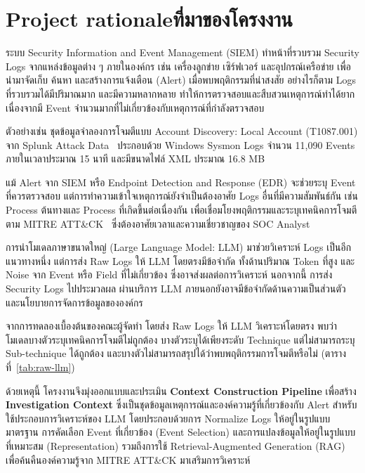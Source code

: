 \section{\ifenglish Project rationale\else ที่มาของโครงงาน\fi}
ระบบ Security Information and Event Management (SIEM) ทำหน้าที่รวบรวม
Security Logs จากแหล่งข้อมูลต่าง ๆ ภายในองค์กร เช่น เครื่องลูกข่าย
เซิร์ฟเวอร์ และอุปกรณ์เครือข่าย เพื่อนำมาจัดเก็บ ค้นหา และสร้างการแจ้งเตือน
(Alert) เมื่อพบพฤติกรรมที่น่าสงสัย อย่างไรก็ตาม Logs ที่รวบรวมได้มีปริมาณมาก
และมีความหลากหลาย ทำให้การตรวจสอบและสืบสวนเหตุการณ์ทำได้ยาก
เนื่องจากมี Event จำนวนมากที่ไม่เกี่ยวข้องกับเหตุการณ์ที่กำลังตรวจสอบ

ตัวอย่างเช่น ชุดข้อมูลจำลองการโจมตีแบบ Account Discovery: Local Account
(T1087.001) จาก Splunk Attack Data~\cite{splunk-attack-data}
ประกอบด้วย Windows Sysmon Logs จำนวน 11,090 Events ภายในเวลาประมาณ
15 นาที และมีขนาดไฟล์ XML ประมาณ 16.8 MB

แม้ Alert จาก SIEM หรือ Endpoint Detection and Response (EDR) 
จะช่วยระบุ Event ที่ควรตรวจสอบ แต่การทำความเข้าใจเหตุการณ์ยังจำเป็นต้องอาศัย
Logs อื่นที่มีความสัมพันธ์กัน เช่น Process ต้นทางและ Process ที่เกิดขึ้นต่อเนื่องกัน
เพื่อเชื่อมโยงพฤติกรรมและระบุเทคนิคการโจมตีตาม MITRE
ATT\&CK~\cite{mitre-attack} ซึ่งต้องอาศัยเวลาและความเชี่ยวชาญของ
SOC Analyst

การนำโมเดลภาษาขนาดใหญ่ (Large Language Model: LLM) มาช่วยวิเคราะห์
Logs เป็นอีกแนวทางหนึ่ง แต่การส่ง Raw Logs ให้ LLM โดยตรงมีข้อจำกัด
ทั้งด้านปริมาณ Token ที่สูง และ Noise จาก Event หรือ Field ที่ไม่เกี่ยวข้อง
ซึ่งอาจส่งผลต่อการวิเคราะห์ นอกจากนี้ การส่ง Security Logs ไปประมวลผล
ผ่านบริการ LLM ภายนอกยังอาจมีข้อจำกัดด้านความเป็นส่วนตัว
และนโยบายการจัดการข้อมูลขององค์กร

จากการทดลองเบื้องต้นของคณะผู้จัดทำ โดยส่ง Raw Logs ให้ LLM วิเคราะห์โดยตรง พบว่าโมเดลบางตัวระบุเทคนิคการโจมตีไม่ถูกต้อง
บางตัวระบุได้เพียงระดับ Technique แต่ไม่สามารถระบุ Sub-technique ได้ถูกต้อง
และบางตัวไม่สามารถสรุปได้ว่าพบพฤติกรรมการโจมตีหรือไม่
(ตารางที่~\ref{tab:raw-llm})

ด้วยเหตุนี้ โครงงานจึงมุ่งออกแบบและประเมิน
\textbf{Context Construction Pipeline} เพื่อสร้าง
\textbf{Investigation Context} ซึ่งเป็นชุดข้อมูลเหตุการณ์และองค์ความรู้ที่เกี่ยวข้องกับ
Alert สำหรับใช้ประกอบการวิเคราะห์ของ LLM โดยประกอบด้วยการ 
Normalize Logs ให้อยู่ในรูปแบบมาตรฐาน การคัดเลือก Event ที่เกี่ยวข้อง
(Event Selection) และการแปลงข้อมูลให้อยู่ในรูปแบบที่เหมาะสม
(Representation) รวมถึงการใช้ Retrieval-Augmented Generation (RAG)~\cite{lewis2020rag}
เพื่อค้นคืนองค์ความรู้จาก MITRE ATT\&CK
มาเสริมการวิเคราะห์

